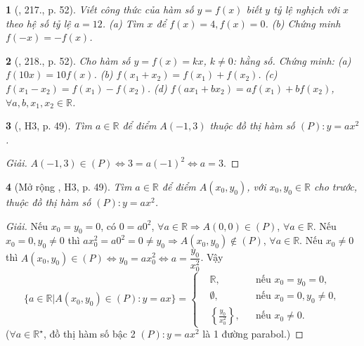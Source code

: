 \documentclass{article}
\newtheorem{baitoan}{}
\begin{document}
\begin{baitoan}[\cite{Tuyen_Toan_8}, 217., p. 52]
	Viết công thức của hàm số $y = f(x)$ biết $y$ tỷ lệ nghịch với $x$ theo hệ số tỷ lệ $a = 12$. (a) Tìm $x$ để $f(x) = 4,f(x) = 0$. (b) Chứng minh $f(-x) = -f(x)$.
\end{baitoan}

\begin{baitoan}[\cite{Tuyen_Toan_8}, 218., p. 52]
	Cho hàm số $y = f(x) = kx$, $k\ne0$: hằng số. Chứng minh: (a) $f(10x) = 10f(x)$. (b) $f(x_1 + x_2) = f(x_1) + f(x_2)$. (c) $f(x_1 - x_2) = f(x_1) - f(x_2)$. (d) $f(ax_1 + bx_2) = af(x_1) + bf(x_2)$, $\forall a,b,x_1,x_2\in\mathbb{R}$.
\end{baitoan}

\begin{baitoan}[\cite{Binh_boi_duong_Toan_9_tap_1}, H3, p. 49]
	Tìm $a\in\mathbb{R}$ để điểm $A(-1,3)$ thuộc đồ thị hàm số $(P):y = ax^2$.
\end{baitoan}

\begin{proof}[Giải]
	$A(-1,3)\in(P)\Leftrightarrow3 = a(-1)^2\Leftrightarrow a = 3$.
\end{proof}

\begin{baitoan}[Mở rộng \cite{Binh_boi_duong_Toan_9_tap_1}, H3, p. 49]
	Tìm $a\in\mathbb{R}$ để điểm $A(x_0,y_0)$, với $x_0,y_0\in\mathbb{R}$ cho trước, thuộc đồ thị hàm số $(P):y = ax^2$.
\end{baitoan}

\begin{proof}[Giải]
	Nếu $x_0 = y_0 = 0$, có $0 = a0^2$, $\forall a\in\mathbb{R}\Rightarrow A(0,0)\in(P)$, $\forall a\in\mathbb{R}$. Nếu $x_0 = 0,y_0\ne0$ thì $ax_0^2 = a0^2 = 0\ne y_0\Rightarrow A(x_0,y_0)\notin(P)$, $\forall a\in\mathbb{R}$. Nếu $x_0\ne0$ thì $A(x_0,y_0)\in(P)\Leftrightarrow y_0 = ax_0^2\Leftrightarrow a = \dfrac{y_0}{x_0^2}$. Vậy
	\begin{equation*}
		\{a\in\mathbb{R}|A(x_0,y_0)\in(P):y = ax\} = \left\{\begin{split}
			&\mathbb{R},&&\mbox{nếu } x_0 = y_0 = 0,\\
			&\emptyset,&&\mbox{nếu } x_0 = 0,y_0\ne0,\\
			&\left\{\frac{y_0}{x_0^2}\right\},&&\mbox{nếu } x_0\ne0.
		\end{split}\right.
	\end{equation*}
	($\forall a\in\mathbb{R}^\star$, đồ thị hàm số bậc 2 $(P):y = ax^2$ là 1 đường parabol.)
\end{proof}
\end{document}
